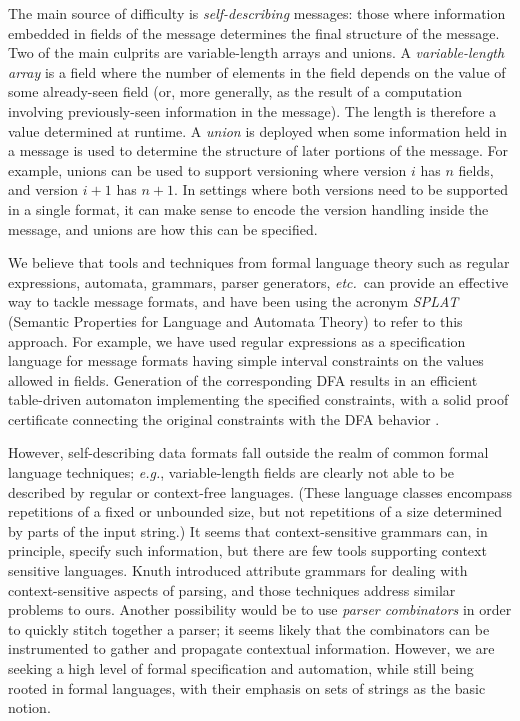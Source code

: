 \documentclass[a4paper,UKenglish,cleveref, autoref, thm-restate]{lipics-v2021}
\newcommand{\eg}{\textit{e.g.}}
\newcommand{\etc}{\textit{etc.}}
\begin{document}
The main source of difficulty is \emph{self-describing} messages:
those where information embedded in fields of the message determines
the final structure of the message. Two of the main culprits are
variable-length arrays and unions. A \emph{variable-length array} is a
field where the number of elements in the field depends on the value
of some already-seen field (or, more generally, as the result of a
computation involving previously-seen information in the message).
The length is therefore a value determined at runtime. A \emph{union}
is deployed when some information held in a message is used to
determine the structure of later portions of the message. For example,
unions can be used to support versioning where version $i$ has $n$
fields, and version $i+1$ has $n+1$. In settings where both versions
need to be supported in a single format, it can make sense to encode
the version handling inside the message, and unions are how this can
be specified.

We believe that tools and techniques from formal language theory such
as regular expressions, automata, grammars, parser generators, \etc\,
can provide an effective way to tackle message formats, and have been
using the acronym \emph{SPLAT} (Semantic Properties for Language and
Automata Theory) to refer to this approach. For example, we have used
regular expressions as a specification language for message formats
having simple interval constraints on the values allowed in
fields. Generation of the corresponding DFA results in an efficient
table-driven automaton implementing the specified constraints, with a
solid proof certificate connecting the original constraints with the
DFA behavior \cite{hardin-slind-safecomp-2016}.

However, self-describing data formats fall outside the realm of common
formal language techniques; \eg, variable-length fields are clearly
not able to be described by regular or context-free languages. (These
language classes encompass repetitions of a fixed or unbounded size,
but not repetitions of a size determined by parts of the input
string.) It seems that context-sensitive grammars can, in principle,
specify such information, but there are few tools supporting context
sensitive languages. Knuth introduced attribute grammars
\cite{knuth-attribute-grammars} for dealing with context-sensitive
aspects of parsing, and those techniques address similar problems to
ours. Another possibility would be to use \emph{parser combinators} in
order to quickly stitch together a parser; it seems likely that the
combinators can be instrumented to gather and propagate contextual
information. However, we are seeking a high level of formal
specification and automation, while still being rooted in formal
languages, with their emphasis on sets of strings as the basic notion.
\end{document}
